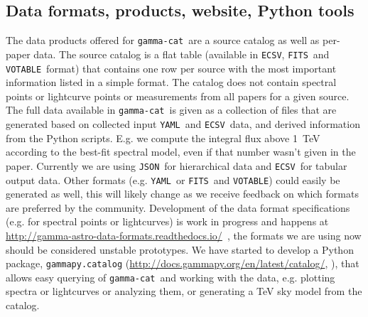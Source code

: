 \documentclass[11pt,twoside]{article}
\newcommand{\gammacat}{\texttt{gamma-cat}}
\newcommand{\yaml}{\texttt{YAML}}
\newcommand{\ecsv}{\texttt{ECSV}}
\newcommand{\fits}{\texttt{FITS}}
\newcommand{\votable}{\texttt{VOTABLE}}
\newcommand{\json}{\texttt{JSON}}
\newcommand{\gadfurl}{\url{http://gamma-astro-data-formats.readthedocs.io/}}
\newcommand{\gammapycat}{\url{http://docs.gammapy.org/en/latest/catalog/}}
\begin{document}
\subsection{Data formats, products, website, Python tools}

The data products offered for \gammacat\ are a source catalog as well as
per-paper data. The source catalog is a flat table (available in \ecsv, \fits\
and \votable\ format) that contains one row per source with the most important
information listed in a simple format. The catalog does not contain spectral
points or lightcurve points or measurements from all papers for a given source.
The full data available in \gammacat\ is given as a collection of files that are
generated based on collected input \yaml\ and \ecsv\ data, and derived
information from the Python scripts. E.g. we compute the integral flux above
1~TeV according to the best-fit spectral model, even if that number wasn't given
in the paper. Currently we are using \json\ for hierarchical data and \ecsv\ for
tabular output data. Other formats (e.g. \yaml\ or \fits\ and \votable) could
easily be generated as well, this will likely change as we receive feedback on
which formats are preferred by the community. Development of the data format
specifications (e.g. for spectral points or lightcurves) is work in progress and
happens at \gadfurl\ \citep{open-gamma}, the formats we are using now should be
considered unstable prototypes. We have started to develop a Python package,
\texttt{gammapy.catalog} (\gammapycat, \citet{gammapy}), that allows easy
querying of \gammacat\ and working with the data, e.g. plotting spectra or
lightcurves or analyzing them, or generating a TeV sky model from the catalog.



% 
% 
% 
\end{document}
